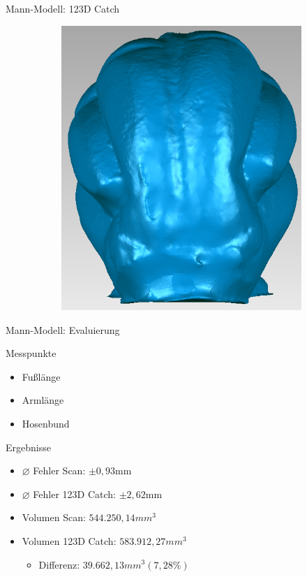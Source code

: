 \documentclass[11pt]{beamer}
\begin{document}
\begin{frame}{Mann-Modell: 123D Catch}
\begin{figure}
\begin{subfigure}{0.4\textwidth}
			\includegraphics[width=\textwidth]{images/Mann_SFM_Back}
		\end{subfigure}
	\end{figure}
\end{frame}

\begin{frame}{Mann-Modell: Evaluierung}

	\begin{block}{Messpunkte}
		\begin{itemize}
		\item Fußlänge
		\item Armlänge
		\item Hosenbund
		\end{itemize}
	\end{block}
	
	\begin{block}{Ergebnisse}
		\begin{itemize}
		\item $\varnothing$ Fehler Scan: $\pm 0,93$mm
		\item $\varnothing$ Fehler 123D Catch: $\pm 2,62$mm
		\item Volumen Scan: $544.250,14mm^3$
		\item Volumen 123D Catch: $583.912,27mm^3$
			\begin{itemize}
			\item Differenz: $39.662,13mm^3(7,28\%)$
			\end{itemize}
		\end{itemize}
	\end{block}
	
\end{frame}
\end{document}
